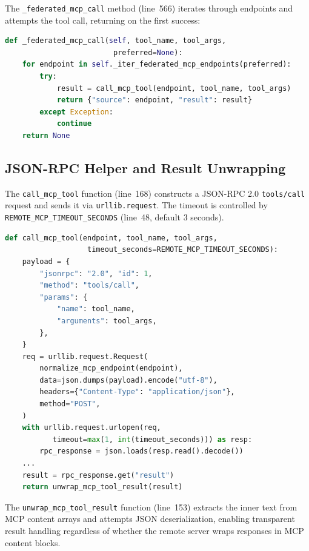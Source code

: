 \documentclass[11pt]{article}
\newcommand{\code}[1]{\texttt{#1}}
\begin{document}
The \code{\_federated\_mcp\_call} method (line~566) iterates through
endpoints and attempts the tool call, returning on the first success:

\begin{lstlisting}[language=Python,caption={Federated MCP call (server.py lines 566--573)},label=lst:federated-call]
def _federated_mcp_call(self, tool_name, tool_args,
                         preferred=None):
    for endpoint in self._iter_federated_mcp_endpoints(preferred):
        try:
            result = call_mcp_tool(endpoint, tool_name, tool_args)
            return {"source": endpoint, "result": result}
        except Exception:
            continue
    return None
\end{lstlisting}

\subsection{JSON-RPC Helper and Result Unwrapping}

The \code{call\_mcp\_tool} function (line~168) constructs a JSON-RPC 2.0
\code{tools/call} request and sends it via \code{urllib.request}.  The
timeout is controlled by \code{REMOTE\_MCP\_TIMEOUT\_SECONDS} (line~48,
default 3 seconds).

\begin{lstlisting}[language=Python,caption={call\_mcp\_tool (server.py lines 168--191)},label=lst:call-mcp-tool]
def call_mcp_tool(endpoint, tool_name, tool_args,
                   timeout_seconds=REMOTE_MCP_TIMEOUT_SECONDS):
    payload = {
        "jsonrpc": "2.0", "id": 1,
        "method": "tools/call",
        "params": {
            "name": tool_name,
            "arguments": tool_args,
        },
    }
    req = urllib.request.Request(
        normalize_mcp_endpoint(endpoint),
        data=json.dumps(payload).encode("utf-8"),
        headers={"Content-Type": "application/json"},
        method="POST",
    )
    with urllib.request.urlopen(req,
           timeout=max(1, int(timeout_seconds))) as resp:
        rpc_response = json.loads(resp.read().decode())
    ...
    result = rpc_response.get("result")
    return unwrap_mcp_tool_result(result)
\end{lstlisting}

The \code{unwrap\_mcp\_tool\_result} function (line~153) extracts the inner
text from MCP content arrays and attempts JSON deserialization, enabling
transparent result handling regardless of whether the remote server wraps
responses in MCP content blocks.
\end{document}
